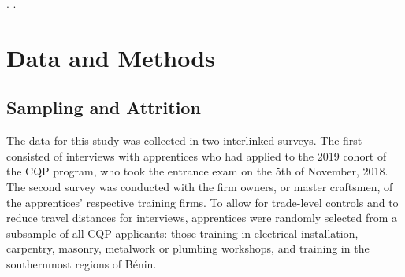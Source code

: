 \documentclass[
  a4paper, twoside, 12pt]{book}
\newcommand{\hlc}[2][color]{}
\begin{document}
\hlc[lightgray]{The main government organs tasked with the administration of the CQP are the national TVET directorate (DETFP), which is in charge of apprentice recruitment and training center accreditation, the Direction of Test and Exam Services (DEC), in charge of the entrance and exit examinations, and FODEFCA }\autocite{nouatin2019}\hlc[lightgray]{. The CQP began curriculum planning in 2005 with technical assistance from the French Development Agency (AFD) and the Swiss Agency for Development and Cooperation (SDC), among others, and became operational in 2008. In 2012, management of the program passed from Swisscontact, a Swiss NGO, entirely into the hands of FODEFCA }\autocite{nouatin2019}\hlc[lightgray]{. Cost sharing for the CQP program is shared by the state and the apprentice, with the state financing body for dual apprenticeship, FODEFCA, officially taking on 90 percent of the training costs }\autocite{kofswisseconomicinstitute2017}\hlc[lightgray]{. However, FODEFCA is largely reliant on external donor funding, and regular financing has been an issue for the program in recent years} \autocite{david-gnahoui2017}. \hlc[lightgray]{The financing of dual training comprises three main budget items: the costs of training to the firm, the administration of the vocational training center, and expenses for entry tests, the final examination, and certification. While on-the-job training in the firm is paid for by the apprentice or their parents, activities in the vocational training centers are largely financed through FODEFCA from various sources (national budget, donors, NGOs, etc.). Certification upon successful completion of the CQP is allocated to the national budget via the Directorate of Examinations, DEC }\autocite{david-gnahoui2017}.

\hypertarget{data}{%
\section{Data and Methods}\label{data}}

\hypertarget{sampling-and-attrition}{%
\subsection{Sampling and Attrition}\label{sampling-and-attrition}}

The data for this study was collected in two interlinked surveys. The first consisted of interviews with apprentices who had applied to the 2019 cohort of the CQP program, who took the entrance exam on the 5th of November, 2018. The second survey was conducted with the firm owners, or master craftsmen, of the apprentices' respective training firms. To allow for trade-level controls and to reduce travel distances for interviews, apprentices were randomly selected from a subsample of all CQP applicants: those training in electrical installation, carpentry, masonry, metalwork or plumbing workshops, and training in the southernmost regions of Bénin.
\end{document}
